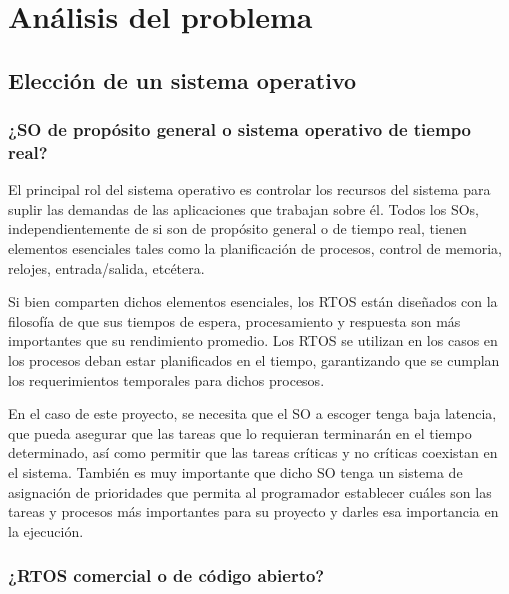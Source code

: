 \chapter{Análisis del problema}


\noindent{}

\section{Elección de un sistema operativo}

\subsection{¿SO de propósito general o sistema operativo de tiempo real?}

El principal rol del sistema operativo es controlar los recursos del sistema para suplir las demandas de las aplicaciones que trabajan sobre él. Todos los SOs, independientemente de si son de propósito general o de tiempo real, tienen elementos esenciales tales como la planificación de procesos, control de memoria, relojes, entrada/salida, etcétera. 

Si bien comparten dichos elementos esenciales, los RTOS están diseñados con la filosofía de que sus tiempos de espera, procesamiento y respuesta son más importantes que su rendimiento promedio. Los RTOS se utilizan en los casos en los procesos deban estar planificados en el tiempo, garantizando que se cumplan los requerimientos temporales para dichos procesos. 

En el caso de este proyecto, se necesita que el SO a escoger tenga baja latencia, que pueda asegurar que las tareas que lo requieran terminarán en el tiempo determinado, así como permitir que las tareas críticas y no críticas coexistan en el sistema. También es muy importante que dicho SO tenga un sistema de asignación de prioridades que permita al programador establecer cuáles son las tareas y procesos más importantes para su proyecto y darles esa importancia en la ejecución.

\subsection{¿RTOS comercial o de código abierto?}

